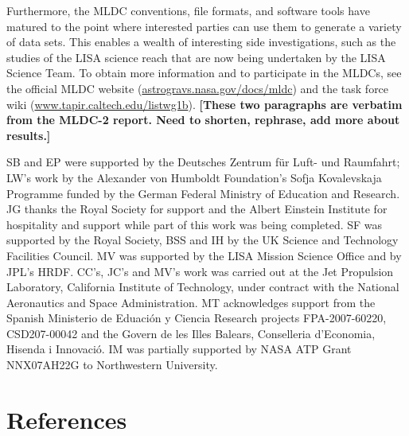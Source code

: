 \documentclass{iopart}
\begin{document}
Furthermore, the MLDC conventions, file formats, and software tools \cite{lisatools} have matured to the point where interested parties can use them to generate a variety of data sets. This enables a wealth of interesting side investigations, such as the studies of the LISA science reach that are now being undertaken by the LISA Science Team. To obtain more information and to participate in the MLDCs, see the official MLDC website (\url{astrogravs.nasa.gov/docs/mldc}) and the task force wiki (\url{www.tapir.caltech.edu/listwg1b}).
\textbf{[These two paragraphs are verbatim from the MLDC-2 report. Need to shorten, rephrase, add more about results.]}

\ack

SB and EP were supported by the Deutsches Zentrum f\"ur Luft- und Raumfahrt; LW's work by the Alexander von Humboldt Foundation's Sofja Kovalevskaja Programme funded by the German Federal Ministry of Education and Research. %
JG thanks the Royal Society for support and the Albert Einstein
Institute for hospitality and support while part of this work was
being completed. %
SF was supported by the Royal Society, BSS and IH by the UK Science and Technology Facilities Council. %
MV was supported by the LISA Mission Science Office and by JPL's HRDF.
CC's, JC's and MV's work was carried out at the Jet Propulsion Laboratory, California Institute of Technology, under contract with the National Aeronautics and Space Administration. %
MT acknowledges support from the Spanish Ministerio de Eduaci\'on y
Ciencia Research projects FPA-2007-60220, CSD207-00042 and the Govern
de les Illes Balears, Conselleria d'Economia, Hisenda i Innovaci\'o. %
IM was partially supported by NASA ATP Grant NNX07AH22G to Northwestern University. %

\section*{References}
\end{document}
